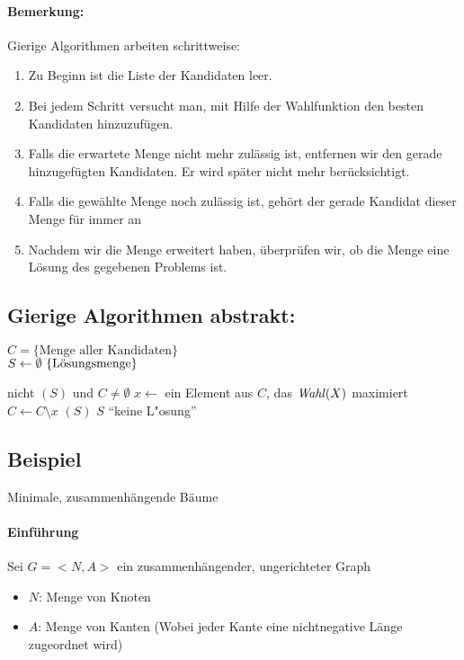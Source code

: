 \documentclass[a4paper,twoside,DIV15,BCOR12mm]{scrbook}
\begin{document}
\paragraph{Bemerkung:} Gierige Algorithmen arbeiten schrittweise:
\begin{enumerate}
\item Zu Beginn ist die Liste der Kandidaten leer.
\item Bei jedem Schritt versucht man, mit Hilfe der Wahlfunktion den besten Kandidaten hinzuzufügen.
\item Falls die erwartete Menge nicht mehr zulässig ist, entfernen wir den gerade hinzugefügten Kandidaten. Er wird später nicht mehr berücksichtigt.
\item Falls die gewählte Menge noch zulässig ist, gehört der gerade Kandidat dieser Menge für immer an
\item Nachdem wir die Menge erweitert haben, überprüfen wir, ob die Menge eine Lösung des gegebenen Problems ist.
\end{enumerate}

\subsection{Gierige Algorithmen abstrakt:}
$C=\{\text{Menge aller Kandidaten}\}$\\
$S \la \emptyset\ \{\text{Lösungsmenge}\}$\\

\begin{codebox}
\li \While nicht $(S)$ und $C \neq \emptyset$
\li     \Do 
            $x \gets$ ein Element aus $C$, das $\id{Wahl}(X)$ maximiert
\li         $C \gets C \setminus {x}$
        \End
\li     \If {}$(S)$
\li     \Then
             $S$
\li     \Else
             "`keine L"osung"'
\end{codebox}

\subsection{Beispiel} Minimale, zusammenhängende Bäume
\paragraph{Einführung}
Sei $G=<N,A>$ ein zusammenhängender, ungerichteter Graph
\begin{itemize}
	\item $N$: Menge von Knoten
	\item $A$: Menge von Kanten (Wobei jeder Kante eine nichtnegative Länge zugeordnet wird)
\end{itemize}
\end{document}
